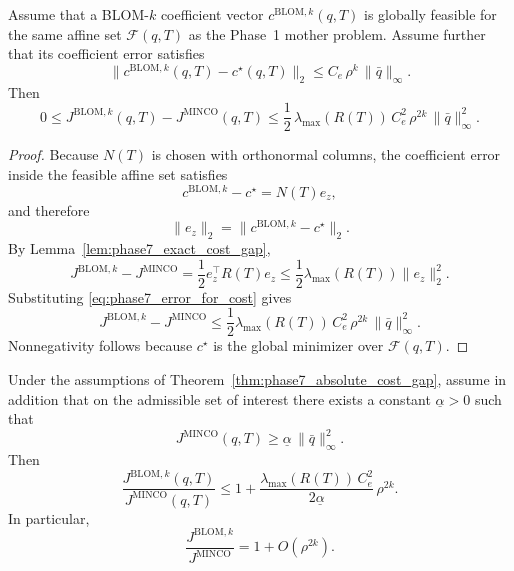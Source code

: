 \begin{theorem}
	\label{thm:phase7_absolute_cost_gap}
	Assume that a BLOM-\(k\) coefficient vector \(c^{\mathrm{BLOM},k}(q,T)\) is globally feasible for the same affine set \(\mathcal F(q,T)\) as the Phase~1 mother problem.
	Assume further that its coefficient error satisfies
	\begin{equation}
		\label{eq:phase7_error_for_cost}
		\bigl\|
		c^{\mathrm{BLOM},k}(q,T)-c^\star(q,T)
		\bigr\|_2
		\le
		C_e\,\rho^k\,\|\bar q\|_\infty.
	\end{equation}
	Then
	\begin{equation}
		\label{eq:phase7_absolute_cost_bound}
		0
		\le
		J^{\mathrm{BLOM},k}(q,T)-J^{\mathrm{MINCO}}(q,T)
		\le
		\frac12\,\lambda_{\max}(R(T))\,C_e^2\,\rho^{2k}\,\|\bar q\|_\infty^2.
	\end{equation}
\end{theorem}

\begin{proof}
	Because \(N(T)\) is chosen with orthonormal columns, the coefficient error inside the feasible affine set satisfies
	\[
	c^{\mathrm{BLOM},k}-c^\star = N(T)e_z,
	\]
	and therefore
	\[
	\|e_z\|_2 = \|c^{\mathrm{BLOM},k}-c^\star\|_2.
	\]
	By Lemma~\ref{lem:phase7_exact_cost_gap},
	\[
	J^{\mathrm{BLOM},k}-J^{\mathrm{MINCO}}
	=
	\frac12 e_z^\top R(T)e_z
	\le
	\frac12 \lambda_{\max}(R(T))\|e_z\|_2^2.
	\]
	Substituting \eqref{eq:phase7_error_for_cost} gives
	\[
	J^{\mathrm{BLOM},k}-J^{\mathrm{MINCO}}
	\le
	\frac12 \lambda_{\max}(R(T))\,C_e^2\,\rho^{2k}\,\|\bar q\|_\infty^2.
	\]
	Nonnegativity follows because \(c^\star\) is the global minimizer over \(\mathcal F(q,T)\).
\end{proof}

\begin{corollary}
	\label{cor:phase7_relative_cost}
	Under the assumptions of Theorem~\ref{thm:phase7_absolute_cost_gap}, assume in addition that on the admissible set of interest there exists a constant \(\underline\alpha>0\) such that
	\begin{equation}
		\label{eq:phase7_minco_lower_bound}
		J^{\mathrm{MINCO}}(q,T)\ge \underline\alpha\,\|\bar q\|_\infty^2.
	\end{equation}
	Then
	\begin{equation}
		\label{eq:phase7_relative_cost_bound}
		\frac{J^{\mathrm{BLOM},k}(q,T)}{J^{\mathrm{MINCO}}(q,T)}
		\le
		1+
		\frac{\lambda_{\max}(R(T))\,C_e^2}{2\underline\alpha}\,\rho^{2k}.
	\end{equation}
	In particular,
	\[
	\frac{J^{\mathrm{BLOM},k}}{J^{\mathrm{MINCO}}}
	=
	1+O(\rho^{2k}).
	\]
\end{corollary}

